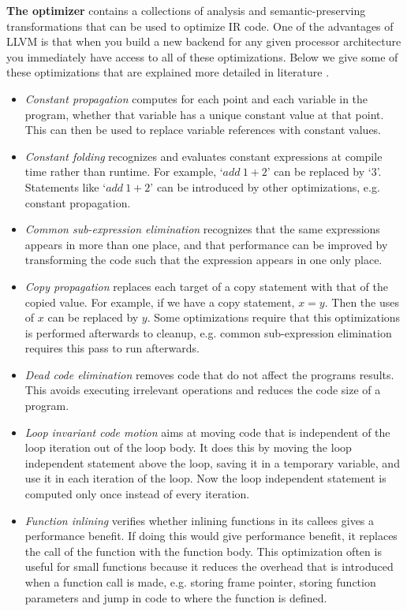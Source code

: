 \textbf{The optimizer} contains a collections of analysis and semantic-preserving transformations that can be used to optimize IR code. One of the advantages of LLVM is that when you build a new backend for any given processor architecture you immediately have access to all of these optimizations. Below we give some of these optimizations that are explained more detailed in literature \cite[Chapter~9]{dragon_book}.%
\begin{itemize}
\item \emph{Constant propagation} computes for each point and each variable in the program, whether that variable has a unique constant value at that point. This can then be used to replace variable references with constant values.
\item \emph{Constant folding} recognizes and evaluates constant expressions at compile time rather than runtime. For example, `$add\ 1+2$' can be replaced by `$3$'. Statements like `$add\ 1+2$' can be introduced by other optimizations, e.g. constant propagation. 
\item \emph{Common sub-expression elimination} recognizes that the same expressions appears in more than one place, and that performance can be improved by transforming the code such that the expression appears in one only place.
\item \emph{Copy propagation} replaces each target of a copy statement with that of the copied value. For example, if we have a copy statement, $x = y$. Then the uses of $x$ can be replaced by $y$. Some optimizations require that this optimizations is performed afterwards to cleanup, e.g. common sub-expression elimination requires this pass to run afterwards. 
\item \emph{Dead code elimination} removes code that do not affect the programs results. This avoids executing irrelevant operations and reduces the code size of a program.  
\item \emph{Loop invariant code motion} aims at moving code that is independent of the loop iteration out of the loop body. It does this by moving the loop independent statement above the loop, saving it in a temporary variable, and use it in each iteration of the loop. Now the loop independent statement is computed only once instead of every iteration. 
\item \emph{Function inlining} verifies whether inlining functions in its callees gives a performance benefit. If doing this would give performance benefit, it replaces the call of the function with the function body. This optimization often is useful for small functions because it reduces the overhead that is introduced when a function call is made, e.g. storing frame pointer, storing function parameters and jump in code to where the function is defined.     
\end{itemize}

